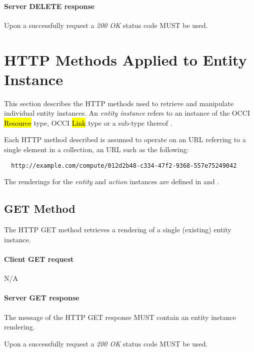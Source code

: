 \documentclass[10pt,a4paper]{article}
\begin{document}
\paragraph{Server DELETE response}
Upon a successfully request a \emph{200 OK} status code MUST be used.

\section{HTTP Methods Applied to Entity Instance}




This section describes the HTTP methods used to retrieve and manipulate
individual entity instances. An {\em entity instance} refers to an instance
of the OCCI \hl{Resource} type, OCCI \hl{Link} type or a sub-type thereof
\cite{occi:core}.

Each HTTP method described is assumed to operate
on an URL referring to a single element in a collection, an URL such as the
following:
\begin{verbatim}
  http://example.com/compute/012d2b48-c334-47f2-9368-557e75249042
\end{verbatim}

The renderings for the {\em entity} and {\em action} instances are defined in \cite{occi:text} and \cite{occi:json}.

\subsection{GET Method}
The HTTP GET method retrieves a rendering of a single (existing) entity instance.

\paragraph{Client GET request}
N/A

\paragraph{Server GET response}
The message of the HTTP GET response MUST contain an entity instance rendering.

Upon a successfully request a \emph{200 OK} status code MUST be used.
\end{document}
